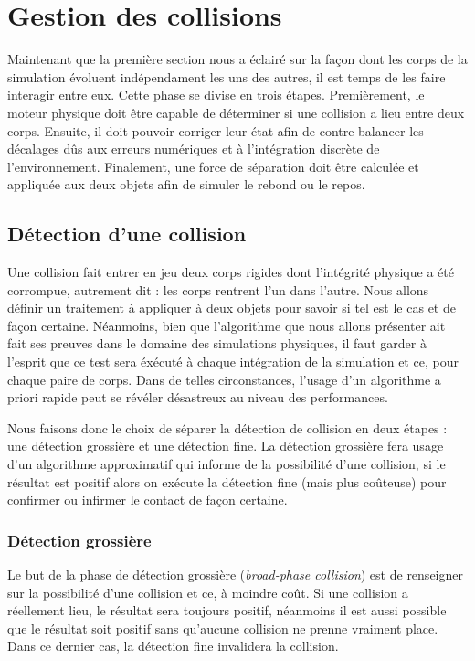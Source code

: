 \section{Gestion des collisions}

Maintenant que la première section nous a éclairé sur la façon dont
les corps de la simulation évoluent indépendament les uns des autres,
il est temps de les faire interagir entre eux. Cette phase se divise
en trois étapes. Premièrement, le moteur physique doit être capable de
déterminer si une collision a lieu entre deux corps. Ensuite, il doit
pouvoir corriger leur état afin de contre-balancer les décalages dûs
aux erreurs numériques et à l'intégration discrète de
l'environnement. Finalement, une force de séparation doit être
calculée et appliquée aux deux objets afin de simuler le rebond ou le
repos.

\subsection{Détection d'une collision}

Une collision fait entrer en jeu deux corps rigides dont l'intégrité
physique a été corrompue, autrement dit : les corps rentrent l'un dans
l'autre. Nous allons définir un traitement à appliquer à deux objets
pour savoir si tel est le cas et de façon certaine. Néanmoins, bien
que l'algorithme que nous allons présenter ait fait ses preuves
dans le domaine des simulations physiques, il faut garder à l'esprit
que ce test sera éxécuté à chaque intégration de la simulation et ce,
pour chaque paire de corps. Dans de telles circonstances, l'usage d'un
algorithme a priori rapide peut se révéler désastreux au niveau des
performances.

Nous faisons donc le choix de séparer la détection de collision en
deux étapes : une détection grossière et une détection fine. La
détection grossière fera usage d'un algorithme approximatif qui
informe de la possibilité d'une collision, si le résultat est positif
alors on exécute la détection fine (mais plus coûteuse) pour confirmer
ou infirmer le contact de façon certaine.

\subsubsection{Détection grossière}

Le but de la phase de détection grossière (\textit{broad-phase
  collision}) est de renseigner sur la possibilité d'une collision et
ce, à moindre coût. Si une collision a réellement lieu, le résultat
sera toujours positif, néanmoins il est aussi possible que le résultat
soit positif sans qu'aucune collision ne prenne vraiment place. Dans
ce dernier cas, la détection fine invalidera la collision.

